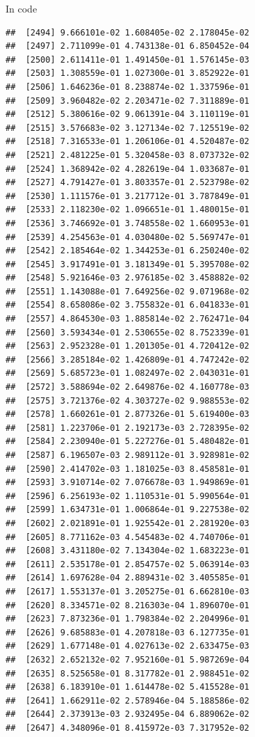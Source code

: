 \documentclass[ignorenonframetext,]{beamer}
\begin{document}
\begin{frame}[fragile]{In code}
\begin{verbatim}
##  [2494] 9.666101e-02 1.608405e-02 2.178045e-02
##  [2497] 2.711099e-01 4.743138e-01 6.850452e-04
##  [2500] 2.611411e-01 1.491450e-01 1.576145e-03
##  [2503] 1.308559e-01 1.027300e-01 3.852922e-01
##  [2506] 1.646236e-01 8.238874e-02 1.337596e-01
##  [2509] 3.960482e-02 2.203471e-02 7.311889e-01
##  [2512] 5.380616e-02 9.061391e-04 3.110119e-01
##  [2515] 3.576683e-02 3.127134e-02 7.125519e-02
##  [2518] 7.316533e-01 1.206106e-01 4.520487e-02
##  [2521] 2.481225e-01 5.320458e-03 8.073732e-02
##  [2524] 1.368942e-02 4.282619e-04 1.033687e-01
##  [2527] 4.791427e-01 3.803357e-01 2.523798e-02
##  [2530] 1.111576e-01 3.217712e-01 3.787849e-01
##  [2533] 2.118230e-02 1.096651e-01 1.480015e-01
##  [2536] 3.746692e-01 3.748558e-02 1.660953e-01
##  [2539] 4.254563e-01 4.030480e-02 5.569747e-01
##  [2542] 2.185464e-02 1.344253e-01 6.250240e-02
##  [2545] 3.917491e-01 3.181349e-01 5.395708e-02
##  [2548] 5.921646e-03 2.976185e-02 3.458882e-02
##  [2551] 1.143088e-01 7.649256e-02 9.071968e-02
##  [2554] 8.658086e-02 3.755832e-01 6.041833e-01
##  [2557] 4.864530e-03 1.885814e-02 2.762471e-04
##  [2560] 3.593434e-01 2.530655e-02 8.752339e-01
##  [2563] 2.952328e-01 1.201305e-01 4.720412e-02
##  [2566] 3.285184e-02 1.426809e-01 4.747242e-02
##  [2569] 5.685723e-01 1.082497e-02 2.043031e-01
##  [2572] 3.588694e-02 2.649876e-02 4.160778e-03
##  [2575] 3.721376e-02 4.303727e-02 9.988553e-02
##  [2578] 1.660261e-01 2.877326e-01 5.619400e-03
##  [2581] 1.223706e-01 2.192173e-03 2.728395e-02
##  [2584] 2.230940e-01 5.227276e-01 5.480482e-01
##  [2587] 6.196507e-03 2.989112e-01 3.928981e-02
##  [2590] 2.414702e-03 1.181025e-03 8.458581e-01
##  [2593] 3.910714e-02 7.076678e-03 1.949869e-01
##  [2596] 6.256193e-02 1.110531e-01 5.990564e-01
##  [2599] 1.634731e-01 1.006864e-01 9.227538e-02
##  [2602] 2.021891e-01 1.925542e-01 2.281920e-03
##  [2605] 8.771162e-03 4.545483e-02 4.740706e-01
##  [2608] 3.431180e-02 7.134304e-02 1.683223e-01
##  [2611] 2.535178e-01 2.854757e-02 5.063914e-03
##  [2614] 1.697628e-04 2.889431e-02 3.405585e-01
##  [2617] 1.553137e-01 3.205275e-01 6.662810e-03
##  [2620] 8.334571e-02 8.216303e-04 1.896070e-01
##  [2623] 7.873236e-01 1.798384e-02 2.204996e-01
##  [2626] 9.685883e-01 4.207818e-03 6.127735e-01
##  [2629] 1.677148e-01 4.027613e-02 2.633475e-03
##  [2632] 2.652132e-02 7.952160e-01 5.987269e-04
##  [2635] 8.525658e-01 8.317782e-01 2.988451e-02
##  [2638] 6.183910e-01 1.614478e-02 5.415528e-01
##  [2641] 1.662911e-02 2.578946e-04 5.188586e-02
##  [2644] 2.373913e-03 2.932495e-04 6.889062e-02
##  [2647] 4.348096e-01 8.415972e-03 7.317952e-02

\end{verbatim}
\end{frame}
\end{document}
